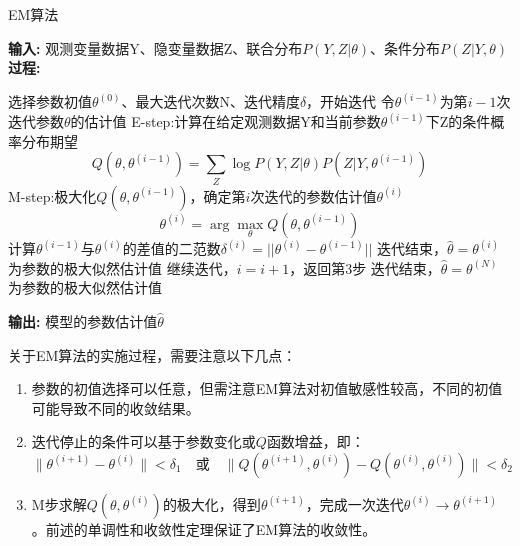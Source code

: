 \documentclass[a4paper,12pt]{ctexart} %
\begin{document}
\begin{center}
    \begin{minipage}{0.95\textwidth}
        \begin{algorithm}[H]
            \caption{EM算法} 
            \label{alg:em}
            {\bf 输入:} 观测变量数据Y、隐变量数据Z、联合分布$P(Y,Z|\theta)$、条件分布$P(Z|Y,\theta)$\\
            {\bf 过程:} 
            \begin{algorithmic}[1]
                \State 选择参数初值$\theta^{(0)}$、最大迭代次数N、迭代精度$\delta$，开始迭代
                \State 令$\theta^{(i-1)}$为第$i-1$次迭代参数$\theta$的估计值
                \State E-step:计算在给定观测数据Y和当前参数$\theta^{(i-1)}$下Z的条件概率分布期望
                \begin{equation}
                        Q(\theta,\theta^{(i-1)}) = \sum_Z\log P(Y,Z|\theta)P(Z|Y,\theta^{(i-1)})
                \end{equation}
                \State M-step:极大化$Q(\theta,\theta^{(i-1)})$，确定第$i$次迭代的参数估计值$\theta^{(i)}$
                \begin{equation}
                    \theta^{(i)} = \arg \max_{\theta}Q(\theta,\theta^{(i-1)})
                \end{equation}
                \State 计算$\theta^{(i-1)}$与$\theta^{(i)}$的差值的二范数$\delta^{(i)}=||\theta^{(i)}-\theta^{(i-1)}||$
                \State 迭代结束，$\hat{\theta} = \theta^{(i)}$为参数的极大似然估计值
                \Else
                \State 继续迭代，$i = i + 1$，返回第3步
                \EndIf
                \EndFor
                \State 迭代结束，$\hat{\theta} = \theta^{(N)}$为参数的极大似然估计值
            \end{algorithmic}
            {\bf 输出:} 模型的参数估计值$\hat{\theta}$
        \end{algorithm}
    \end{minipage}
\end{center}

关于EM算法的实施过程，需要注意以下几点：
\begin{enumerate}
    \item 参数的初值选择可以任意，但需注意EM算法对初值敏感性较高，不同的初值可能导致不同的收敛结果。
    \item 迭代停止的条件可以基于参数变化或$Q$函数增益，即：
    \begin{equation}
    \|\theta^{(i+1)} - \theta^{(i)}\| < \delta_1 \quad \text{或} \quad \|Q(\theta^{(i+1)},\theta^{(i)}) - Q(\theta^{(i)},\theta^{(i)})\| < \delta_2
    \end{equation}
    \item M步求解$Q(\theta,\theta^{(i)})$的极大化，得到$\theta^{(i+1)}$，完成一次迭代$\theta^{(i)} \to \theta^{(i+1)}$。前述的单调性和收敛性定理保证了EM算法的收敛性。
\end{enumerate}
\end{document}
